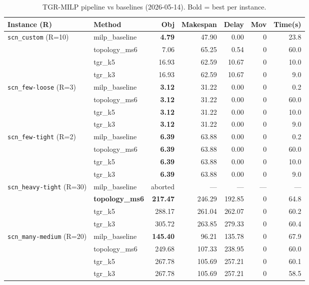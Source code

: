\begin{table}[h]
\centering
\caption{TGR-MILP pipeline vs baselines (2026-05-14).  Bold = best per instance.}
\label{tab:exp02}
\begin{tabular}{llrrrrr}
\toprule
Instance (R) & Method & Obj & Makespan & Delay & Mov & Time(s) \\
\midrule
\multirow{4}{*}{\texttt{scn\_custom} (R=10)}
 & milp\_baseline & \textbf{4.79}  &  47.90 &  0.00 & 0 & 23.8 \\
 & topology\_ms6  & 7.06           &  65.25 &  0.54 & 0 & 60.0 \\
 & tgr\_k5        & 16.93          &  62.59 & 10.67 & 0 & 10.0 \\
 & tgr\_k3        & 16.93          &  62.59 & 10.67 & 0 &  9.0 \\
\midrule
\multirow{4}{*}{\texttt{scn\_few-loose} (R=3)}
 & milp\_baseline & \textbf{3.12}  &  31.22 &  0.00 & 0 & 0.2 \\
 & topology\_ms6  & \textbf{3.12}  &  31.22 &  0.00 & 0 & 60.0 \\
 & tgr\_k5        & \textbf{3.12}  &  31.22 &  0.00 & 0 & 10.0 \\
 & tgr\_k3        & \textbf{3.12}  &  31.22 &  0.00 & 0 &  9.0 \\
\midrule
\multirow{4}{*}{\texttt{scn\_few-tight} (R=2)}
 & milp\_baseline & \textbf{6.39}  &  63.88 &  0.00 & 0 & 0.2 \\
 & topology\_ms6  & \textbf{6.39}  &  63.88 &  0.00 & 0 & 60.0 \\
 & tgr\_k5        & \textbf{6.39}  &  63.88 &  0.00 & 0 & 10.0 \\
 & tgr\_k3        & \textbf{6.39}  &  63.88 &  0.00 & 0 &  9.0 \\
\midrule
\multirow{3}{*}{\texttt{scn\_heavy-tight} (R=30)}
 & milp\_baseline & aborted         &      — &     — & — &    — \\
 & \textbf{topology\_ms6} & \textbf{217.47} & 246.29 & 192.85 & 0 & 64.8 \\
 & tgr\_k5        & 288.17          & 261.04 & 262.07 & 0 & 60.2 \\
 & tgr\_k3        & 305.72          & 263.85 & 279.33 & 0 & 60.4 \\
\midrule
\multirow{4}{*}{\texttt{scn\_many-medium} (R=20)}
 & milp\_baseline & \textbf{145.40} &  96.21 & 135.78 & 0 & 67.9 \\
 & topology\_ms6  & 249.68          & 107.33 & 238.95 & 0 & 60.0 \\
 & tgr\_k5        & 267.78          & 105.69 & 257.21 & 0 & 60.1 \\
 & tgr\_k3        & 267.78          & 105.69 & 257.21 & 0 & 58.5 \\
\bottomrule
\end{tabular}
\end{table}

